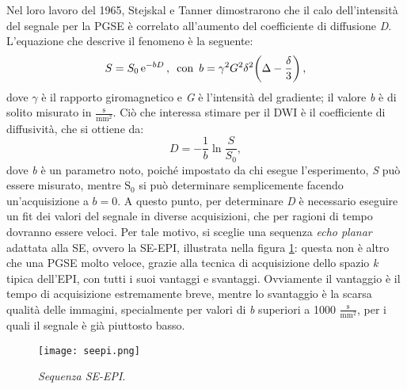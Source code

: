 \documentclass{report}
\newcommand{\figref}[1]{figura \ref{#1}}
\numberwithin{equation}{section}
\numberwithin{figure}{section}
\begin{document}
Nel loro lavoro del 1965, Stejskal e Tanner dimostrarono che il calo dell'intensità del segnale per la PGSE è correlato all'aumento del coefficiente di diffusione \textit{D}. L'equazione che descrive il fenomeno è la seguente:
\begin{equation}
    S = S_0\,\mathrm{e}^{-bD}\,,\hspace{5 pt} \text{con} \hspace{5 pt} b = \gamma^2 G^2 \delta^2 \bigg( \Delta - \frac{\delta}{3} \bigg)\,,
\end{equation}
dove $\gamma$ è il rapporto giromagnetico e \textit{G} è l'intensità del gradiente; il valore \textit{b} è di solito misurato in $\mathrm{\frac{s}{mm^2}}$. Ciò che interessa stimare per il DWI è il coefficiente di diffusività, che si ottiene da:
\begin{equation}
    D = -\frac{1}{b} \ln{\frac{S}{S_0}},
\end{equation}
dove \textit{b} è un parametro noto, poiché impostato da chi esegue l'esperimento, \textit{S} può essere misurato, mentre $\mathrm{S_0}$ si può determinare semplicemente facendo un'acquisizione a $b=0$. A questo punto, per determinare \textit{D} è necessario eseguire un fit dei valori del segnale in diverse acquisizioni, che per ragioni di tempo dovranno essere veloci. Per tale motivo, si sceglie una sequenza \textit{echo planar} adattata alla SE, ovvero la SE-EPI, illustrata nella \figref{fig:seepi}: questa non è altro che una PGSE molto veloce, grazie alla tecnica di acquisizione dello spazio \textit{k} tipica dell'EPI, con tutti i suoi vantaggi e svantaggi. Ovviamente il vantaggio è il tempo di acquisizione estremamente breve, mentre lo svantaggio è la scarsa qualità delle immagini, specialmente per valori di \textit{b} superiori a 1000 $\mathrm{\frac{s}{mm^2}}$, per i quali il segnale è già piuttosto basso.

\begin{figure}[htp]
\centering
\texttt{[image: seepi.png]}
\caption{\label{fig:seepi} \textit{Sequenza SE-EPI}.}
\end{figure}
\end{document}
